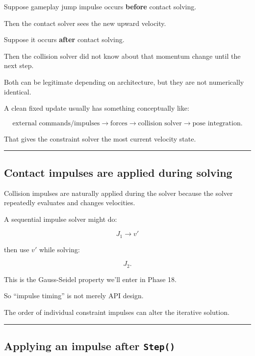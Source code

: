 Suppose gameplay jump impulse occurs \textbf{before} contact solving.

Then the contact solver sees the new upward velocity.

Suppose it occurs \textbf{after} contact solving.

Then the collision solver did not know about that momentum change until the next step.

Both can be legitimate depending on architecture, but they are not numerically identical.

A clean fixed update usually has something conceptually like:

\[
\text{external commands/impulses}
\rightarrow
\text{forces}
\rightarrow
\text{collision solver}
\rightarrow
\text{pose integration}.
\]

That gives the constraint solver the most current velocity state.

\begin{center}\rule{0.5\linewidth}{0.5pt}\end{center}

\subsection{Contact impulses are applied during solving}\label{06-engine-ii-ch038-contact-impulses-are-applied-during-solving}

Collision impulses are naturally applied during the solver because the solver repeatedly evaluates and changes velocities.

A sequential impulse solver might do:

\[
J_1
\rightarrow
v'
\]

then use \(v'\) while solving:

\[
J_2.
\]

This is the Gauss-Seidel property we'll enter in Phase 18.

So ``impulse timing'' is not merely API design.

The order of individual constraint impulses can alter the iterative solution.

\begin{center}\rule{0.5\linewidth}{0.5pt}\end{center}

\subsection{\texorpdfstring{Applying an impulse after \texttt{Step()}}{Applying an impulse after Step()}}\label{06-engine-ii-ch038-applying-an-impulse-after-step}

